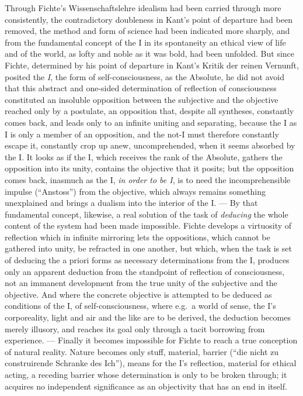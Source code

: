 \divrule

Through Fichte's Wissenschaftslehre idealism had been
carried through more consistently, the contradictory doubleness in
Kant's point of departure had been removed, the method and form of
science had been indicated more sharply, and from the fundamental
concept of the I in its spontaneity an ethical view of life and of the
world, as lofty and noble as it was bold, had been unfolded. But since
Fichte, determined by his point of departure in Kant's Kritik der
reinen Vernunft, posited the \emph{I}, the form of self-consciousness,
as the Absolute, he did not avoid that this abstract and one-sided
determination of reflection of consciousness constituted an insoluble
opposition between the subjective and the objective reached only by a
postulate, an opposition that, despite all syntheses, constantly comes
back, and leads only to an infinite uniting and separating, because the
I as I is only a member of an opposition, and the not-I must therefore
constantly escape it, constantly crop up anew, uncomprehended, when it
seems absorbed by the I. It looks as if the I, which receives the rank
of the Absolute, gathers the opposition into its unity, contains the
objective that it posits; but the opposition comes back, inasmuch as
the I, \emph{in order to be I}, is to need the incomprehensible impulse
(``Anstoss'') from the objective, which always remains something
unexplained and brings a dualism into the interior of the I. --- By
that fundamental concept, likewise, a real solution of the task of
\emph{deducing} the whole content of the system had been made
impossible. Fichte develops a virtuosity of reflection which in
infinite mirroring lets the oppositions, which cannot be gathered into
unity, be refracted in one another, but which, when the task is set of
deducing the a priori forms as necessary determinations from the I,
produces only an apparent deduction from the standpoint of reflection
of consciousness, not an immanent development from the true unity of
the subjective and the objective. And where the concrete objective is
attempted to be deduced as conditions of the I, of self-consciousness,
where e.g.\ a world of sense, the I's corporeality, light and air and
the like are to be derived, the deduction becomes merely illusory, and
reaches its goal only through a tacit borrowing from
experience. --- Finally it becomes impossible for Fichte to
reach a true conception of natural reality. Nature becomes only stuff,
material, barrier (``die nicht zu construirende Schranke des Ich''),
means for the I's reflection, material for ethical acting, a receding
barrier whose determination is only to be broken through; it acquires
no independent significance as an objectivity that has an end in
itself.

